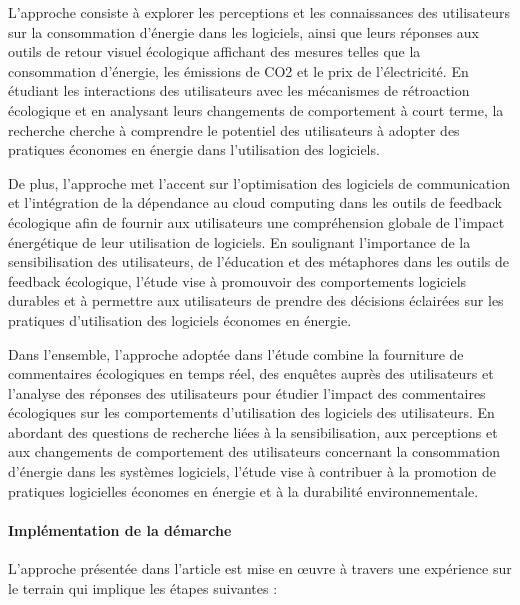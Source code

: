 L'approche consiste à explorer les perceptions et les connaissances des utilisateurs sur la consommation d'énergie dans les logiciels, ainsi que leurs réponses aux outils de retour visuel écologique affichant des mesures telles que la consommation d'énergie, les émissions de CO2 et le prix de l'électricité. En étudiant les interactions des utilisateurs avec les mécanismes de rétroaction écologique et en analysant leurs changements de comportement à court terme, la recherche cherche à comprendre le potentiel des utilisateurs à adopter des pratiques économes en énergie dans l'utilisation des logiciels.

De plus, l'approche met l'accent sur l'optimisation des logiciels de communication et l'intégration de la dépendance au cloud computing dans les outils de feedback écologique afin de fournir aux utilisateurs une compréhension globale de l'impact énergétique de leur utilisation de logiciels. En soulignant l'importance de la sensibilisation des utilisateurs, de l'éducation et des métaphores dans les outils de feedback écologique, l'étude vise à promouvoir des comportements logiciels durables et à permettre aux utilisateurs de prendre des décisions éclairées sur les pratiques d'utilisation des logiciels économes en énergie.

Dans l'ensemble, l'approche adoptée dans l'étude combine la fourniture de commentaires écologiques en temps réel, des enquêtes auprès des utilisateurs et l'analyse des réponses des utilisateurs pour étudier l'impact des commentaires écologiques sur les comportements d'utilisation des logiciels des utilisateurs. En abordant des questions de recherche liées à la sensibilisation, aux perceptions et aux changements de comportement des utilisateurs concernant la consommation d'énergie dans les systèmes logiciels, l'étude vise à contribuer à la promotion de pratiques logicielles économes en énergie et à la durabilité environnementale.

\paragraph{Implémentation de la démarche}
L'approche présentée dans l'article est mise en œuvre à travers une expérience sur le terrain qui implique les étapes suivantes :

